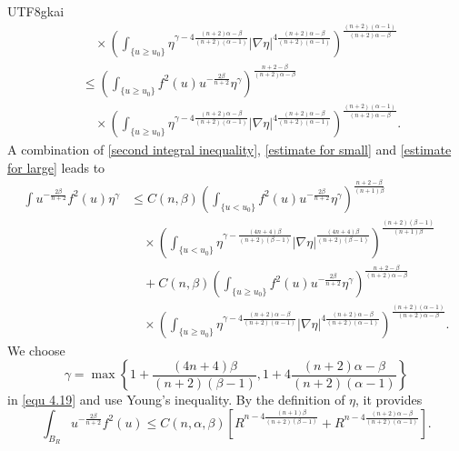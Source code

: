 \documentclass[reqno,12pt]{amsart}
\numberwithin{equation}{section}
\begin{document}
\begin{CJK}{UTF8}{gkai}
\begin{equation}
\begin{aligned}
   	  		&\quad \times \left( \int_{\{u\ge u_{0}\}} \eta^{\gamma-4\frac{(n+2)\alpha-\beta}{(n+2)(\alpha-1)}} |\nabla \eta|^{4\frac{(n+2)\alpha-\beta}{(n+2)(\alpha-1)}} \right)^{\frac{(n+2)(\alpha-1)}{(n+2)\alpha-\beta}} \\
   	  	&\le \left( \int_{\{u\ge u_{0}\}} f^{2}(u)u^{-\frac{2\beta}{n+2}} \eta^{\gamma} \right)^{\frac{n+2-\beta}{(n+2)\alpha-\beta}} \\
   	  	&\quad \times \left( \int_{\{u\ge u_{0}\}} \eta^{\gamma-4\frac{(n+2)\alpha-\beta}{(n+2)(\alpha-1)}} |\nabla \eta|^{4\frac{(n+2)\alpha-\beta}{(n+2)(\alpha-1)}} \right)^{\frac{(n+2)(\alpha-1)}{(n+2)\alpha-\beta}}.
   	  	\end{aligned}
   	  \end{equation}
   A combination of \eqref{second integral inequality}, \eqref{estimate for small} and \eqref{estimate for large} leads to
	\begin{equation}\label{equ 4.19}
		\begin{aligned}
				\int u^{-\frac{2\beta}{n+2}} f^{2}(u)\eta^{\gamma}
				&\le C(n,\beta) \left( \int_{\{u<u_{0}\}} f^{2}(u) u^{-\frac{2\beta}{n+2}} \eta^{\gamma} \right)^{\frac{n+2-\beta}{(n+1)\beta}} \\
				&\quad \times \left( \int_{\{u<u_{0}\}} \eta^{\gamma-\frac{(4n+4)\beta}{(n+2)(\beta-1)}} |\nabla \eta|^{\frac{(4n+4)\beta}{(n+2)(\beta-1)}} \right)^{\frac{(n+2)(\beta-1)}{(n+1)\beta}} \\
				 &\quad +C(n,\beta) \left( \int_{\{u\ge u_{0}\}} f^{2}(u)u^{-\frac{2\beta}{n+2}} \eta^{\gamma} \right)^{\frac{n+2-\beta}{(n+2)\alpha-\beta}} \\
				 &\quad \times \left( \int_{\{u\ge u_{0}\}} \eta^{\gamma-4\frac{(n+2)\alpha-\beta}{(n+2)(\alpha-1)}} |\nabla \eta|^{4\frac{(n+2)\alpha-\beta}{(n+2)(\alpha-1)}} \right)^{\frac{(n+2)(\alpha-1)}{(n+2)\alpha-\beta}}.
		\end{aligned}
	\end{equation}
  	We choose $$\gamma=\max\left\{ 1+\frac{(4n+4)\beta}{(n+2)(\beta-1)},1+4\frac{(n+2)\alpha-\beta}{(n+2)(\alpha-1)} \right\}  $$
  	in \eqref{equ 4.19} and use Young's inequality. By the definition of $\eta$, it provides
  	\begin{equation}\label{finalestimate2}
  		\int_{B_{R}}  u^{-\frac{2\beta}{n+2}} f^{2}(u) \le C(n,\alpha,\beta)\left[R^{n-4\frac{(n+1)\beta}{(n+2)(\beta-1)}}+R^{n-4\frac{(n+2)\alpha-\beta}{(n+2)(\alpha-1)}}\right].
  	\end{equation}
  	

\end{CJK}
\end{document}
